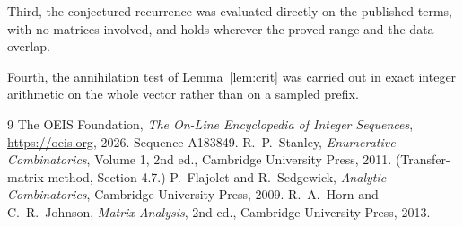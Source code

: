 \documentclass[11pt,a4paper]{article}
\theoremstyle{plain}
\theoremstyle{definition}
\begin{document}
Third, the conjectured recurrence was evaluated directly on the published terms, with no
matrices involved, and holds wherever the proved range and the data overlap.

Fourth, the annihilation test of Lemma~\ref{lem:crit} was carried out in exact integer
arithmetic on the whole vector rather than on a sampled prefix.

\begin{thebibliography}{9}
 The OEIS Foundation, \emph{The On-Line Encyclopedia of Integer
Sequences}, \url{https://oeis.org}, 2026. Sequence A183849.
 R.~P.~Stanley, \emph{Enumerative Combinatorics}, Volume 1, 2nd ed.,
Cambridge University Press, 2011. (Transfer-matrix method, Section 4.7.)
 P.~Flajolet and R.~Sedgewick, \emph{Analytic Combinatorics}, Cambridge
University Press, 2009.
 R.~A.~Horn and C.~R.~Johnson, \emph{Matrix Analysis}, 2nd ed., Cambridge
University Press, 2013.
\end{thebibliography}
\end{document}
